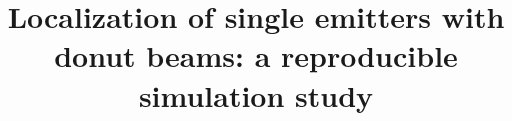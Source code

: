 \documentclass[aps,pra,twocolumn,superscriptaddress]{revtex4-2}
\begin{document}
\title{Localization of single emitters with donut beams: a reproducible simulation study}
\maketitle


\end{document}
